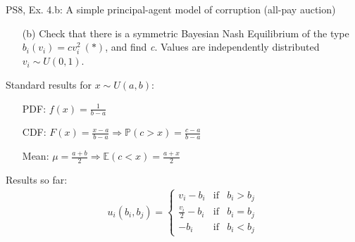 \begin{frame}{PS8, Ex. 4.b: A simple principal-agent model of corruption (all-pay auction)}
    \begin{itemize}
      \item[(b)] Check that there is a symmetric Bayesian Nash Equilibrium of the type $b_i(v_i) = cv_i^2\ (*)$, and find \textit{c}. Values are independently distributed $v_i\sim U(0, 1)$.
    \end{itemize} \vspace{-8pt}
    \begin{multicols}{2}
      \vfill\null\columnbreak
      Standard results for $x\sim U(a, b):$ \vspace{-6pt}
      \begin{itemize}
        \item[PDF:] $f(x)=\frac{1}{b-a}$
        \item[CDF:] $F(x)=\frac{x-a}{b-a}\Rightarrow\mathbb{P}(c>x)=\frac{c-a}{b-a}$
        \item[Mean:] $\mu=\frac{a+b}{2}\Rightarrow\mathbb{E}(c<x)=\frac{a+x}{2}$
      \end{itemize}
      \vspace{-6pt}
      Results so far: \vspace{-6pt}
      \begin{align*}
        u_i(b_i,b_j)=\left\{\begin{array}{lcl}
          v_i-b_i           & \text{if} & b_i>b_j \\
          \frac{v_i}{2}-b_i & \text{if} & b_i=b_j \\
          -b_i              & \text{if} & b_i<b_j
        \end{array}\right.
      \end{align*}
      \vfill\null
    \end{multicols}
\end{frame}
